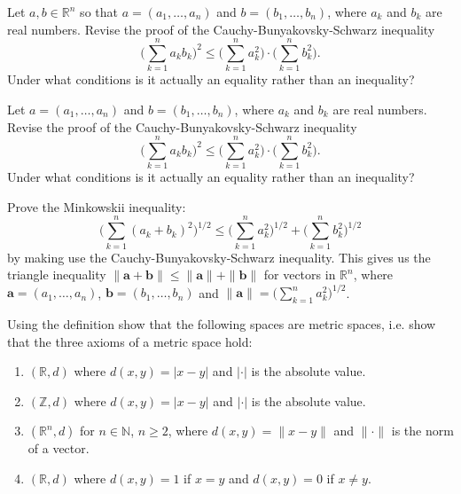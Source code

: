 \documentclass[11pt]{article}%
\newcommand{\R}{\mathbb{R}}
\newcommand{\N}{\mathbb{N}}
\begin{document}
\begin{Exercise}[title=**$\dagger$]
	Let $a,b\in\R^n$ so that $a=(a_1,\ldots, a_n)$ and $b=(b_1,\ldots, b_n)$, where $a_k$ and $b_k$ are real numbers. Revise the proof of the Cauchy-Bunyakovsky-Schwarz inequality 
	$$
	\Big(\sum_{k=1}^{n}a_kb_k\Big)^2\leq \Big(\sum_{k=1}^{n}a_k^2\Big)\cdot\Big(\sum_{k=1}^{n}b_k^2\Big).
	$$
	Under what conditions is it actually an equality rather than an inequality?
	\bigskip
\end{Exercise}

\begin{Exercise}[title=**]
	Let $a=(a_1,\ldots, a_n)$ and $b=(b_1,\ldots, b_n)$, where $a_k$ and $b_k$ are real numbers. Revise the proof of the Cauchy-Bunyakovsky-Schwarz inequality 
	$$
	\Big(\sum_{k=1}^{n}a_kb_k\Big)^2\leq \Big(\sum_{k=1}^{n}a_k^2\Big)\cdot\Big(\sum_{k=1}^{n}b_k^2\Big).
	$$
	Under what conditions is it actually an equality rather than an inequality?
	\bigskip
	
	 Prove the Minkowskii inequality: $$\Big(\sum_{k=1}^{n}(a_k+b_k)^2\Big)^{1/2}\leq\Big(\sum_{k=1}^{n}a_k^2\Big)^{1/2}+\Big(\sum_{k=1}^{n}b_k^2\Big)^{1/2}
	$$ 
	by making use the Cauchy-Bunyakovsky-Schwarz inequality. This gives us the triangle inequality $\|\mathbf a+\mathbf b\|\leq\|\mathbf a\|+\|\mathbf b\|$ for vectors in $\mathbb R^n$, where $\mathbf a=(a_1,\ldots,a_n)$, $\mathbf b=(b_1,\ldots,b_n)$ and $\|\mathbf a\|=\Big(\sum_{k=1}^{n}a_k^2\Big)^{1/2}$.
	\bigskip
\end{Exercise}

\begin{Exercise} [title=*$\dagger$]
	Using the definition show that the following spaces are metric spaces, i.e. show that the three axioms of a metric space hold:
	\begin{enumerate}
		\item $(\R,d)$ where $d(x,y)=|x-y|$ and $|\cdot|$ is the absolute value.
		\item $(\mathbb Z,d)$ where $d(x,y)=|x-y|$ and $|\cdot|$ is the absolute value.
		\item $(\R^n,d)$ for $n\in\N$, $n\geq 2$, where $d(x,y)=\lVert x-y\rVert$ and $\lVert \cdot\rVert$ is the norm of a vector.
		\item $(\R,d)$ where $d(x,y)=1$ if $x=y$ and $d(x,y)=0$ if $x\neq y$.
	\end{enumerate}
\end{Exercise}
\end{document}
